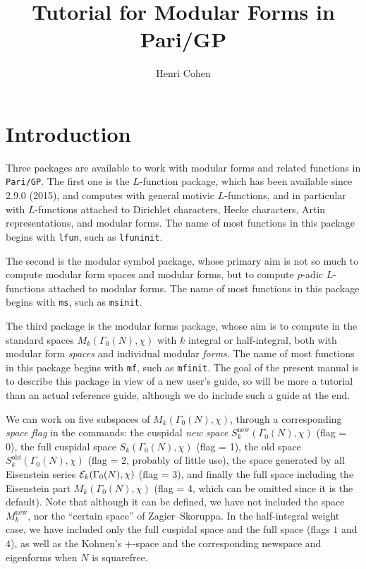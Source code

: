 \documentclass[11pt]{article}
\newcommand{\G}{\Gamma}
\newcommand{\new}{\text{new}}
\def\kbd#1{{\tt #1}}
\begin{document}
\pagestyle{plain}

\title{Tutorial for Modular Forms in Pari/GP}
\author{Henri Cohen}

\maketitle

\smallskip

\section{Introduction}

Three packages are available to work with modular forms and related functions
in \kbd{Pari/GP}. The first one is the $L$-function package, which has been
available since 2.9.0 (2015), and computes with general motivic
$L$-functions, and in particular with $L$-functions attached to Dirichlet
characters, Hecke characters, Artin representations, and modular forms. The
name of most functions in this package begins with \kbd{lfun}, such as
\kbd{lfuninit}.

The second is the modular symbol package, whose primary aim
is not so much to compute modular form spaces and modular forms, but to
compute $p$-adic $L$-functions attached to modular forms. The name of most
functions in this package begins with \kbd{ms}, such as \kbd{msinit}.

The third package is the modular forms package, whose aim is to compute in
the standard spaces $M_k(\G_0(N),\chi)$ with $k$ integral or half-integral,
both with modular form \emph{spaces} and individual modular \emph{forms}. The
name of most functions in this package begins with \kbd{mf}, such as
\kbd{mfinit}. The goal of the present manual is to describe this package in
view of a new user's guide, so will be more a tutorial than an actual
reference guide, although we do include such a guide at the end.

\medskip

We can work on five subspaces of $M_k(\G_0(N),\chi)$, through a
corresponding \emph{space flag} in the commands: the cuspidal \emph{new
space} $S_k^{\new}(\G_0(N),\chi)$ (flag = 0), the full cuspidal space
$S_k(\G_0(N),\chi)$ (flag = 1), the old space $S_k^{\text{old}}(\G_0(N),\chi)$
(flag = 2, probably of little use), the space generated by all Eisenstein
series ${\cal E}_k(\G_0(N),\chi)$ (flag = 3), and finally the full space
including the Eisenstein part $M_k(\G_0(N),\chi)$ (flag = 4, which can be
omitted since it is the default). Note that although it can be defined, we have
not included the space $M_k^{\new}$, nor the ``certain space'' of
Zagier--Skoruppa. In the half-integral weight case, we have included
only the full cuspidal space and the full space (flags $1$ and $4$), as
well as the Kohnen's $+$-space and the corresponding newspace and eigenforms
when $N$ is squarefree.
\end{document}
